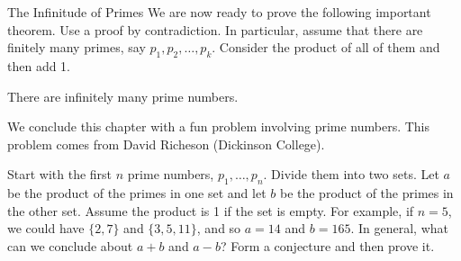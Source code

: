 \begin{section}{The Infinitude of Primes}
We are now ready to prove the following important theorem. Use a proof by contradiction. In particular, assume that there are finitely many primes, say $p_1, p_2,\ldots,p_k$.  Consider the product of all of them and then add 1.

\begin{theorem}\label{thm:infprimes}
There are infinitely many prime numbers.
\end{theorem}

We conclude this chapter with a fun problem involving prime numbers.  This problem comes from David Richeson (Dickinson College).  %

\begin{problem}
Start with the first $n$ prime numbers, $p_1,\ldots, p_n$. Divide them into two sets. Let $a$ be the product of the primes in one set and let $b$ be the product of the primes in the other set. Assume the product is 1 if the set is empty. For example, if $n=5$, we could have $\{2,7\}$ and $\{3,5,11\}$, and so $a=14$ and $b=165$. In general, what can we conclude about $a+b$ and $a-b$? Form a conjecture and then prove it.
\end{problem}

\end{section}
